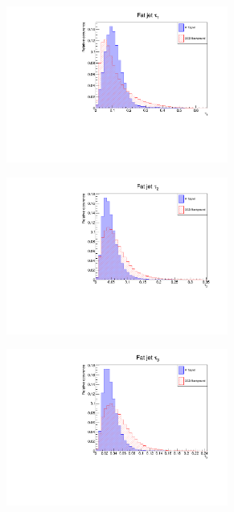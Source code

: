 \documentclass[main]{subfiles} %
\begin{document}
\begin{figure}[H]
     \centering
     \begin{subfigure}[h]{0.49\textwidth}
         \centering
         \includegraphics[width=0.8\textwidth]{../Figures/Results/W_distributions/W_tau1_distribution.pdf}
          \caption{}
         \label{fig:W_distribution_tau1}
     \end{subfigure}
     \begin{subfigure}[h]{0.49\textwidth}
         \centering
         \includegraphics[width=0.8\textwidth]{../Figures/Results/W_distributions/W_tau2_distribution.pdf}
          \caption{}
         \label{fig:W_distribution_tau2}
     \end{subfigure}
     \par\bigskip
     \begin{subfigure}[h]{0.49\textwidth}
         \centering
         \includegraphics[width=0.8\textwidth]{../Figures/Results/W_distributions/W_tau3_distribution.pdf}

\end{subfigure}
\end{figure}
\end{document}
